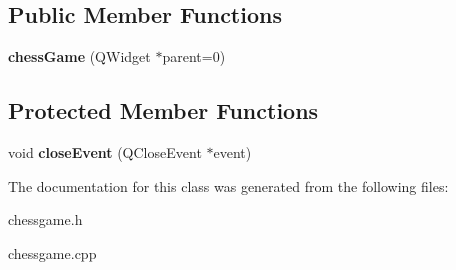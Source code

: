 \subsection*{Public Member Functions}
\begin{DoxyCompactItemize}
\item 
\mbox{\label{classchessGame_a9d6406de47a97ca52a4016a5caf9f598}} 
{\bfseries chess\+Game} (Q\+Widget $\ast$parent=0)
\end{DoxyCompactItemize}
\subsection*{Protected Member Functions}
\begin{DoxyCompactItemize}
\item 
\mbox{\label{classchessGame_aa030ac566950d641e55f7d5b9d249f7c}} 
void {\bfseries close\+Event} (Q\+Close\+Event $\ast$event)
\end{DoxyCompactItemize}


The documentation for this class was generated from the following files\+:\begin{DoxyCompactItemize}
\item 
chessgame.\+h\item 
chessgame.\+cpp\end{DoxyCompactItemize}
